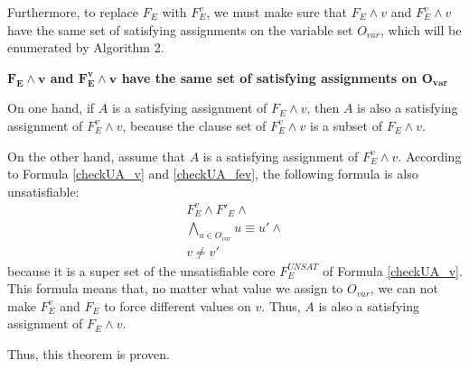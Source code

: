 \documentclass[journal]{IEEEtran}
\begin{document}
Furthermore,
to replace $F_E$ with $F_E^v$,
we must make sure that $F_E\wedge v$ and $F_E^v\wedge v$ have the same set of satisfying assignments on the variable set $O_{var}$,
which will be enumerated by Algorithm 2.
\begin{theorem}[]\label{thm_fe_fev_eq}
\textbf{$\boldsymbol{F_E\wedge v}$ and $\boldsymbol{F_E^v\wedge v}$ have the same set of satisfying assignments on $\boldsymbol{O_{var}}$}
\end{theorem}
\begin{IEEEproof}
On one hand,
if $A$ is a satisfying assignment of $F_E\wedge v$,
then $A$ is also a satisfying assignment of $F_E^v\wedge v$,
because the clause set of $F_E^v\wedge v$ is a subset of $F_E\wedge v$.

On the other hand,
assume that $A$ is a satisfying assignment of $F_E^v\wedge v$.
According to Formula \ref{checkUA_v} and \ref{checkUA_fev},
the following formula is also unsatisfiable:
\begin{displaymath}
\begin{array}{c}
F_E^v\wedge F'_E\wedge \\
\bigwedge_{u\in O_{var}} u\equiv u'\wedge \\
v\ne v'
\end{array}
\end{displaymath}
because it is a super set of the unsatisfiable core $F_E^{UNSAT}$ of Formula \ref{checkUA_v}.
This formula means that,
no matter what value we assign to $O_{var}$,
we can not make $F_E^v$ and $F_E$ to force different values on $v$.
Thus,
$A$ is also a satisfying assignment of $F_E\wedge v$.

Thus, this theorem is proven.
\end{IEEEproof}
\end{document}
